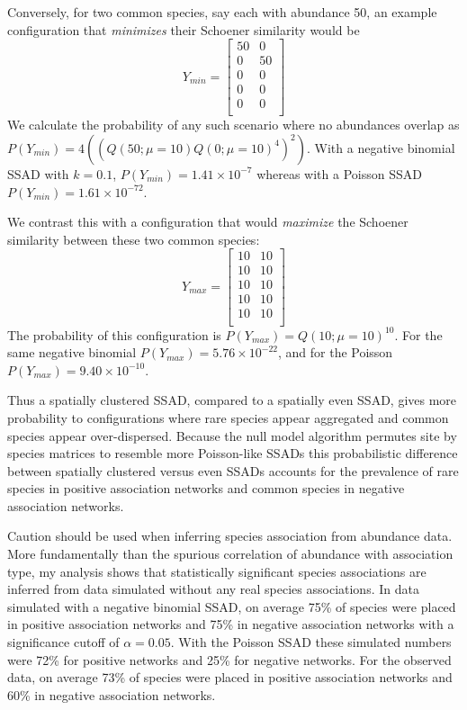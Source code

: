 \documentclass[
]{article}
\begin{document}
Conversely, for two common species, say each with abundance 50, an
example configuration that \emph{minimizes} their Schoener similarity
would be \[
Y_{min} = \begin{bmatrix} 50 & 0 \\ 0 & 50 \\ 0 & 0 \\ 0 & 0 \\ 0 & 0 \\ \end{bmatrix}
\] We calculate the probability of any such scenario where no abundances
overlap as
\(P(Y_{min}) = 4 \left(\left(Q(50; \mu = 10) Q(0; \mu = 10)^{4}\right)^2\right)\).
With a negative binomial SSAD with \(k = 0.1\),
\(P(Y_{min}) = 1.41 \times 10^{-7}\) whereas with a Poisson SSAD
\(P(Y_{min}) = 1.61 \times 10^{-72}\).

We contrast this with a configuration that would \emph{maximize} the
Schoener similarity between these two common species: \[
Y_{max} = \begin{bmatrix} 10 & 10 \\ 10 & 10 \\ 10 & 10 \\ 10 & 10 \\ 10 & 10 \\ \end{bmatrix}
\] The probability of this configuration is
\(P(Y_{max}) = Q(10; \mu = 10)^{10}\). For the same negative binomial
\(P(Y_{max}) = 5.76 \times 10^{-22}\), and for the Poisson
\(P(Y_{max}) = 9.40 \times 10^{-10}\).

Thus a spatially clustered SSAD, compared to a spatially even SSAD,
gives more probability to configurations where rare species appear
aggregated and common species appear over-dispersed. Because the null
model algorithm permutes site by species matrices to resemble more
Poisson-like SSADs this probabilistic difference between spatially
clustered versus even SSADs accounts for the prevalence of rare species
in positive association networks and common species in negative
association networks.

Caution should be used when inferring species association from abundance
data. More fundamentally than the spurious correlation of abundance with
association type, my analysis shows that statistically significant
species associations are inferred from data simulated without any real
species associations. In data simulated with a negative binomial SSAD,
on average 75\% of species were placed in positive association networks
and 75\% in negative association networks with a significance cutoff of
\(\alpha = 0.05\). With the Poisson SSAD these simulated numbers were
72\% for positive networks and 25\% for negative networks. For the
observed data, on average 73\% of species were placed in positive
association networks and 60\% in negative association networks.
\end{document}
